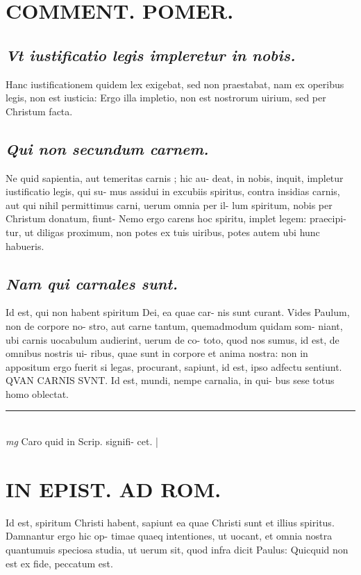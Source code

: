 \documentclass{article}
\begin{document}
\begin{pages}
\section*{COMMENT. POMER.  }
{}
\subsection*{\textit{Vt iustificatio legis impleretur in nobis. }}\pstart Hanc iustificationem quidem lex exigebat, sed non praestabat, nam ex operibus legis, non est iusticia: Ergo illa impletio, non est nostrorum uirium, sed per Christum facta.   \pend
{}
{}
\subsection*{\textit{Qui non secundum carnem. }}\pstart Ne quid sapientia, aut temeritas carnis ; hic au- deat, in nobis, inquit, impletur iustificatio legis, qui su- mus assidui in excubiis spiritus, contra insidias carnis, aut qui nihil permittimus carni, uerum omnia per il- lum spiritum, nobis per Christum donatum, fiunt- Nemo ergo carens hoc spiritu, implet legem: praecipi- tur, ut diligas proximum, non potes ex tuis uiribus, potes autem ubi hunc habueris.   \pend
{}
{}
\subsection*{\textit{Nam qui carnales sunt. }}\pstart Id est, qui non habent spiritum Dei, ea quae car- nis sunt curant. Vides Paulum, non de corpore no- stro, aut carne tantum, quemadmodum quidam som- niant, ubi carnis uocabulum audierint, uerum de co- toto, quod nos sumus, id est, de omnibus nostris ui- ribus, quae sunt in corpore et anima nostra: non in appositum ergo fuerit si legas, procurant, sapiunt, id est, ipso adfectu sentiunt. QVAN CARNIS SVNT. Id est, mundi, nempe carnalia, in qui- bus sese totus homo oblectat.   \pend
\vspace{0.5cm}\noindent
\vspace{0.2cm}\rule{1cm}{0.2pt}\\ 
\hspace{0.2cm}\textit{mg}
\footnotesize Caro quid in Scrip. signifi- cet.  
\normalsize| 
\section*{IN EPIST. AD ROM.  }
\marginpar{[ p.84 ]}
\marginpar{[ p.]}\pstart Id est, spiritum Christi habent, sapiunt ea quae Christi sunt et illius spiritus. Damnantur ergo hic op- timae quaeq intentiones, ut uocant, et omnia nostra quantumuis speciosa studia, ut uerum sit, quod infra dicit Paulus: Quicquid non est ex fide, peccatum est.   \pend
{}
{}

\end{pages}
\end{document}
